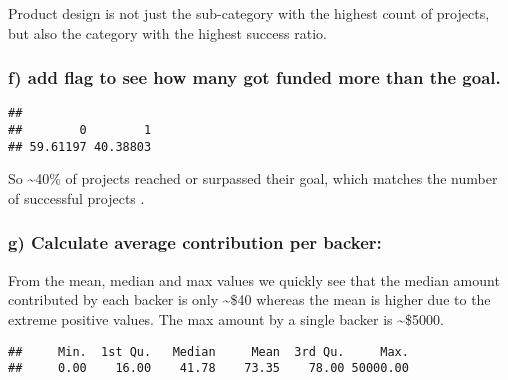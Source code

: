 \documentclass[]{article}
\newenvironment{Shaded}{\begin{snugshade}}{\end{snugshade}}
\newcommand{\KeywordTok}[1]{\textcolor[rgb]{0.13,0.29,0.53}{\textbf{#1}}}
\newcommand{\DecValTok}[1]{\textcolor[rgb]{0.00,0.00,0.81}{#1}}
\newcommand{\StringTok}[1]{\textcolor[rgb]{0.31,0.60,0.02}{#1}}
\newcommand{\OperatorTok}[1]{\textcolor[rgb]{0.81,0.36,0.00}{\textbf{#1}}}
\newcommand{\NormalTok}[1]{#1}
\begin{document}
Product design is not just the sub-category with the highest count of
projects, but also the category with the highest success ratio.

\subsubsection{f) add flag to see how many got funded more than the
goal.}\label{f-add-flag-to-see-how-many-got-funded-more-than-the-goal.}

\begin{Shaded}
\end{Shaded}

\begin{verbatim}
## 
##        0        1 
## 59.61197 40.38803
\end{verbatim}

So \textasciitilde{}40\% of projects reached or surpassed their goal,
which matches the number of successful projects .

\subsubsection{g) Calculate average contribution per
backer:}\label{g-calculate-average-contribution-per-backer}

From the mean, median and max values we quickly see that the median
amount contributed by each backer is only \textasciitilde{}\$40 whereas
the mean is higher due to the extreme positive values. The max amount by
a single backer is \textasciitilde{}\$5000.

\begin{Shaded}
\end{Shaded}

\begin{verbatim}
##     Min.  1st Qu.   Median     Mean  3rd Qu.     Max. 
##     0.00    16.00    41.78    73.35    78.00 50000.00
\end{verbatim}
\end{document}
